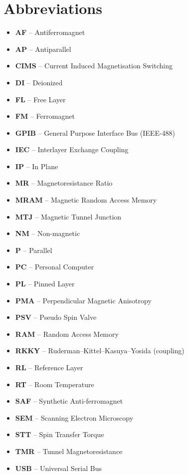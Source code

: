 \section{Abbreviations}
\begin{itemize}
    \item    \textbf{AF}      --    Antiferromagnet
    \item    \textbf{AP}      --    Antiparallel
	\item    \textbf{CIMS}    --    Current Induced Magnetisation Switching
	\item    \textbf{DI}      --    Deionized
	\item    \textbf{FL}      --    Free Layer
	\item    \textbf{FM}      --    Ferromagnet
	\item    \textbf{GPIB}    --    General Purpose Interface Bus (IEEE-488)
	\item    \textbf{IEC}     --    Interlayer Exchange Coupling
	\item    \textbf{IP}      --    In Plane
	\item    \textbf{MR}      --    Magnetoresistance Ratio
    \item    \textbf{MRAM}    --    Magnetic Random Access Memory
    \item    \textbf{MTJ}     --    Magnetic Tunnel Junction
    \item    \textbf{NM}      --    Non-magnetic
    \item    \textbf{P}       --    Parallel
    \item    \textbf{PC}      --    Personal Computer
    \item    \textbf{PL}      --    Pinned Layer
    \item    \textbf{PMA}     --    Perpendicular Magnetic Anisotropy
    \item    \textbf{PSV}     --    Pseudo Spin Valve
    \item    \textbf{RAM}     --    Random Access Memory
    \item    \textbf{RKKY}    --    Ruderman–Kittel–Kasuya–Yosida (coupling)
    \item    \textbf{RL}      --    Reference Layer
    \item    \textbf{RT}      --    Room Temperature
    \item    \textbf{SAF}     --    Synthetic Anti-ferromagnet
    \item    \textbf{SEM}     --    Scanning Electron Microscopy
    \item    \textbf{STT}     --    Spin Transfer Torque
    \item    \textbf{TMR}     --    Tunnel Magnetoresistance
    \item    \textbf{USB}     --    Universal Serial Bus
\end{itemize}
